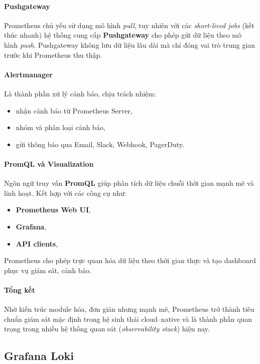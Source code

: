 \paragraph*{Pushgateway}  
Prometheus chủ yếu sử dụng mô hình \textit{pull}, tuy nhiên với các \textit{short-lived jobs} 
(kết thúc nhanh) hệ thống cung cấp \textbf{Pushgateway} cho phép gửi dữ liệu theo mô hình \textit{push}.  
Pushgateway không lưu dữ liệu lâu dài mà chỉ đóng vai trò trung gian trước khi Prometheus thu thập.

\paragraph*{Alertmanager}  
Là thành phần xử lý cảnh báo, chịu trách nhiệm:

\begin{itemize}
    \item nhận cảnh báo từ Prometheus Server,
    \item nhóm và phân loại cảnh báo,
    \item gửi thông báo qua Email, Slack, Webhook, PagerDuty.
\end{itemize}

\paragraph*{PromQL và Visualization}  
Ngôn ngữ truy vấn \textbf{PromQL} giúp phân tích dữ liệu chuỗi thời gian mạnh mẽ và linh hoạt.  
Kết hợp với các công cụ như:

\begin{itemize}
    \item \textbf{Prometheus Web UI},
    \item \textbf{Grafana},
    \item \textbf{API clients},
\end{itemize}

Prometheus cho phép trực quan hóa dữ liệu theo thời gian thực và tạo dashboard phục vụ giám sát, cảnh báo.

\paragraph*{Tổng kết}  
Nhờ kiến trúc module hóa, đơn giản nhưng mạnh mẽ, Prometheus trở thành tiêu chuẩn giám sát 
mặc định trong hệ sinh thái cloud–native và là thành phần quan trọng trong nhiều hệ thống quan sát 
(\textit{observability stack}) hiện nay.

\subsection{Grafana Loki}

